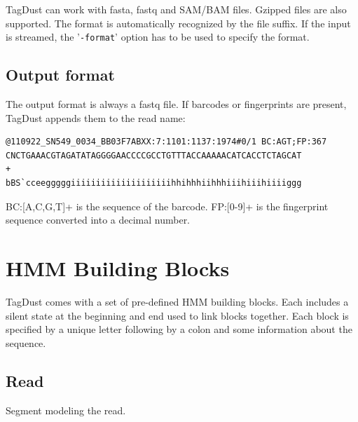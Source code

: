 \documentclass[11pt,a4paper,oneside]{book}
\begin{document}
TagDust can work with fasta, fastq and SAM/BAM files. Gzipped files are also supported. The format is automatically recognized by the file suffix. If the input is streamed, the '{\tt -format}' option has to be used to specify the format.\\
 
\subsection{Output format}
The output format is always a fastq file. If barcodes or fingerprints are present, TagDust appends them to the read name: 

{\small
\begin{verbatim}
@110922_SN549_0034_BB03F7ABXX:7:1101:1137:1974#0/1 BC:AGT;FP:367
CNCTGAAACGTAGATATAGGGGAACCCCGCCTGTTTACCAAAAACATCACCTCTAGCAT
+
bBS`cceegggggiiiiiiiiiiiiiiiiiiiihhihhhiihhhiiihiiihiiiiggg
\end{verbatim}
}

BC:[A,C,G,T]+ is the sequence of the barcode. FP:[0-9]+ is the fingerprint sequence converted into a decimal number.


\section{HMM Building Blocks}
TagDust comes with a set of pre-defined HMM building blocks. Each includes a silent state at the beginning and end used to link blocks together. Each block is specified by a unique letter following by a colon and some information about the sequence. 


\subsection{Read}
Segment modeling the read. \\

\begin{figure}[H]
\centering
{}
\end{figure}
\end{document}

